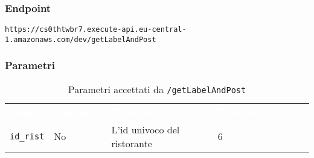 \subsubsection{Endpoint}
\texttt{https://cs0thtwbr7.execute-api.eu-central-1.amazonaws.com/dev/getLabelAndPost}

\subsubsection{Parametri}
\begin{table}[!htbp]
\renewcommand{\arraystretch}{1.5}

\begin{tabular}[t]{ m{}<{\centering}  m{}<{\centering} m{}<{\centering} m{}<{\centering}  m{}<{\centering} }
	\rowcolor{darkblue}
	\textcolor{white}{\textbf{Nome}} &\textcolor{white}{\textbf{Opzionale}} &\textcolor{white}{\textbf{Descrizione}} &\textcolor{white}{\textbf{Esempio}} &\textcolor{white}{\textbf{Default}} \\ 
\texttt{id\_rist} & No & L'id univoco del ristorante  & 6 &  \\

\end{tabular}
\caption{Parametri accettati da \texttt{/getLabelAndPost}}
\end{table}
\pagebreak
